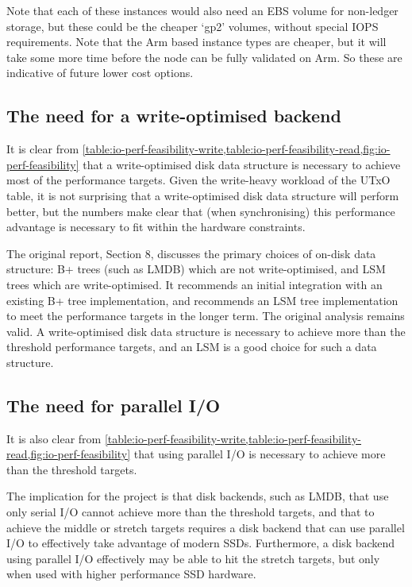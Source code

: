 \documentclass[11pt,a4paper]{article}
\begin{document}
Note that each of these instances would also need an EBS volume for non-ledger
storage, but these could be the cheaper `gp2' volumes, without special IOPS
requirements. Note that the Arm based instance types are cheaper, but it
will take some more time before the node can be fully validated on Arm. So
these are indicative of future lower cost options.

\subsection{The need for a write-optimised backend}

It is clear from
\cref{table:io-perf-feasibility-write,table:io-perf-feasibility-read,fig:io-perf-feasibility} that a write-optimised disk data structure is necessary to achieve
most of the performance targets. Given the write-heavy workload of the UTxO
table, it is not surprising that a write-optimised disk data structure will
perform better, but the numbers make clear that (when synchronising)
this performance advantage is necessary to fit within the hardware constraints.

The original report, \cite{utxo-db} Section 8, discusses the primary choices of
on-disk data structure: B+ trees (such as LMDB) which are not write-optimised,
and LSM trees which are write-optimised. It recommends an initial integration
with an existing B+ tree implementation, and recommends an LSM tree
implementation to meet the performance targets in the longer term. The original
analysis remains valid. A write-optimised disk data structure is necessary to
achieve more than the threshold performance targets, and an LSM is a good
choice for such a data structure.

\subsection{The need for parallel I/O}

It is also clear from
\cref{table:io-perf-feasibility-write,table:io-perf-feasibility-read,fig:io-perf-feasibility} that using parallel I/O is necessary to achieve more than the
threshold targets.

The implication for the project is that disk backends, such as LMDB, that use
only serial I/O cannot achieve more than the threshold targets, and that to
achieve the middle or stretch targets requires a disk backend that can use
parallel I/O to effectively take advantage of modern SSDs. Furthermore, a disk
backend using parallel I/O effectively may be able to hit the stretch targets,
but only when used with higher performance SSD hardware.
\end{document}
